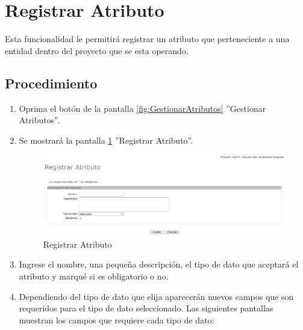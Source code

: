 
\hypertarget{cv:registrarAtributo}{\section{Registrar Atributo}} \label{sec:registrarAtributo}

	Esta funcionalidad le permitirá registrar un atributo que perteneciente a una entidad dentro del proyecto que se esta operando. 

		\subsection{Procedimiento}

			\begin{enumerate}
	
			\item Oprima el botón \IURegistrar{} de la pantalla \ref{fig:GestionarAtributos} ''Gestionar Atributos''.
			
			\item Se mostrará la pantalla \ref{fig:registrarAtributo} ''Registrar Atributo''.

			\begin{figure}[H]
				\begin{center}
					\includegraphics[scale=0.5]{roles/lider/entidades/atributos/pantallas/IU12-1-1registrarAtributo}
					\caption{Registrar Atributo}
					\label{fig:registrarAtributo}
				\end{center}
			\end{figure}
		
			\item Ingrese el nombre, una pequeña descripción, el tipo de dato que aceptará el atributo y marqué si es obligatorio o no.
			
			\item Dependiendo del tipo de dato que elija aparecerán nuevos campos que son requeridos para el tipo de dato seleccionado. Las siguientes pantallas muestran los campos que requiere cada tipo de dato:
			

\end{enumerate}
